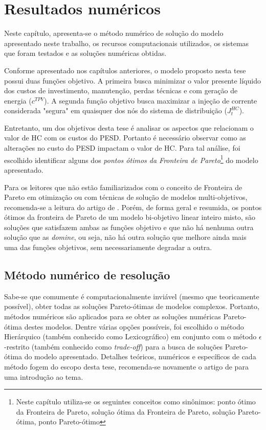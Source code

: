 \chapter{Resultados numéricos}

Neste capítulo, apresenta-se o método numérico de solução do modelo apresentado neste trabalho, os recursos computacionais utilizados, os sistemas que foram testados e as soluções numéricas obtidas. 


Conforme apresentado nos capítulos anteriores, o modelo proposto nesta tese possui duas funções objetivo. A primeira busca minimizar o valor presente líquido dos custos de investimento, manutenção, perdas técnicas e com geração de energia ($c^{TPV}$). A segunda função objetivo busca maximizar a injeção de corrente considerada "segura"\; em quaisquer dos nós do sistema de distribuição ($J^{HC}_t$).

Entretanto, um dos objetivos desta tese é analisar os aspectos que relacionam o valor de \ac{HC} com os custos do \ac{PESD}. Portanto é necessário observar como as alterações no custo do \ac{PESD} impactam o valor de \ac{HC}. Para tal análise, foi escolhido identificar alguns dos \textit{pontos ótimos da Fronteira de Pareto}\footnote{Neste capítulo utiliza-se os seguintes conceitos como sinônimos: ponto ótimo da Fronteira de Pareto, solução ótima da Fronteira de Pareto, solução Pareto-ótima, ponto Pareto-ótimo} do modelo apresentado.

Para os leitores que não estão familiarizados com o conceito de Fronteira de Pareto em otimização ou com técnicas de solução de modelos multi-objetivos, recomenda-se a leitura do artigo de . Porém, de forma geral e resumida, os pontos ótimos da fronteira de Pareto de um modelo bi-objetivo linear inteiro misto, são soluções que satisfazem ambas as funções objetivo e que não há nenhuma outra solução que as \textit{domine}, ou seja, não há outra solução que melhore ainda mais uma das funções objetivos, sem necessariamente degradar a outra. 


\section{Método numérico de resolução}

Sabe-se que comumente é computacionalmente inviável (mesmo que teoricamente possível), obter todas as soluções Pareto-ótimas de modelos complexos. Portanto, métodos numéricos são aplicados para se obter as soluções numéricas Pareto-ótima destes modelos. Dentre várias opções possíveis, foi escolhido o método Hierárquico (também conhecido como Lexicográfico) em conjunto com o método $\epsilon$-restrito (também conhecido como \textit{trade-off}) para a busca de soluções Pareto-ótima do modelo apresentado. Detalhes teóricos, numéricos e específicos de cada método fogem do escopo desta tese, recomenda-se novamente o artigo de  para uma introdução ao tema.

